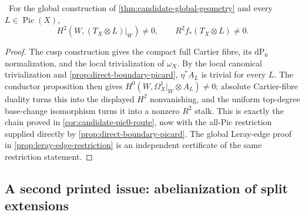 \begin{corollary}
\label{cor:candidate-conductor-actual}
\Verified\ For the global construction of
\cref{thm:candidate-global-geometry} and every
$L\in\operatorname{Pic}(X)$,
\[
H^2(W,(T_X\otimes L)|_W)\ne0,
\qquad R^2f_*(T_X\otimes L)\ne0.
\]
\end{corollary}

\begin{proof}
The cusp construction gives the compact full Cartier fibre, its
$\mathrm{dP}_6$ normalization, and the local trivialization of $\omega_X$.
By the local canonical trivialization and
\cref{prop:direct-boundary-picard}, $\eta^*A_L$ is trivial for every $L$.
The conductor proposition then gives
$H^0(W,\Omega_X^1|_W\otimes A_L)\ne0$; absolute Cartier-fibre duality turns
this into the displayed $H^2$ nonvanishing, and the uniform top-degree
base-change isomorphism turns it into a nonzero $R^2$ stalk.  This is exactly
the chain proved in \cref{cor:candidate-pic0-route}, now with the all-Pic
restriction supplied directly by \cref{prop:direct-boundary-picard}.  The
global Leray-edge proof in \cref{prop:leray-edge-restriction} is an
independent certificate of the same restriction statement.
\end{proof}

\subsection{A second printed issue: abelianization of split extensions}

